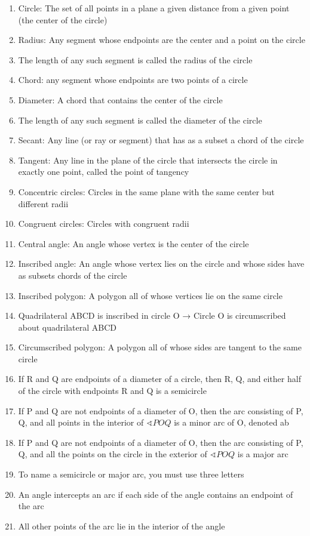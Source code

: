 \begin{enumerate}
    \item Circle: The set of all points in a plane a given distance from a given point (the center of the circle)
    \item Radius: Any segment whose endpoints are the center and a point on the circle
    \item The length of any such segment is called the radius of the circle
    \item Chord: any segment whose endpoints are two points of a circle
    \item Diameter: A chord that contains the center of the circle
    \item The length of any such segment is called the diameter of the circle
    \item Secant: Any line (or ray or segment) that has as a subset a chord of the circle
    \item Tangent: Any line in the plane of the circle that intersects the circle in exactly one point, called the point of tangency
    \item Concentric circles: Circles in the same plane with the same center but different radii
    \item Congruent circles: Circles with congruent radii
    \item Central angle: An angle whose vertex is the center of the circle
    \item Inscribed angle: An angle whose vertex lies on the circle and whose sides have as subsets chords of the circle
    \item Inscribed polygon: A polygon all of whose vertices lie on the same circle
    \item Quadrilateral ABCD is inscribed in circle O → Circle O is circumscribed about quadrilateral ABCD
    \item Circumscribed polygon: A polygon all of whose sides are tangent to the same circle
    \item If R and Q are endpoints of a diameter of a circle, then R, Q, and either half of the circle with endpoints R and Q is a semicircle
    \item If P and Q are not endpoints of a diameter of O, then the arc consisting of P, Q, and all points in the interior of $\sphericalangle POQ$ is a minor arc of O, denoted ab
    \item If P and Q are not endpoints of a diameter of O, then the arc consisting of P, Q, and all the points on the circle in the exterior of $\sphericalangle POQ$ is a major arc
    \item To name a semicircle or major arc, you must use three letters
    \item An angle intercepts an arc if each side of the angle contains an endpoint of the arc
    \item All other points of the arc lie in the interior of the angle
\end{enumerate}

